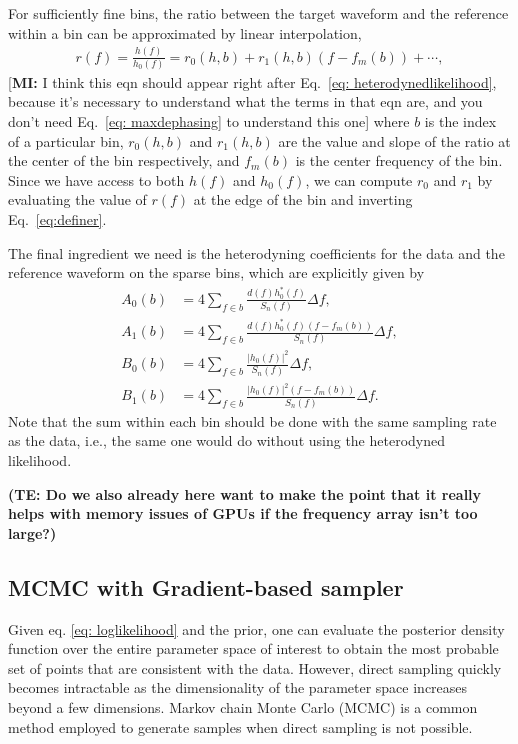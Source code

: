 \documentclass[twocolumn]{aastex631}
\newcommand{\te}[1]{\textbf{\color{pyRed}(TE: #1)}}
\newcommand{\mi}[1]{\textsf{\color{teal}[\textbf{MI:} #1]}}
\begin{document}
For sufficiently fine bins, the ratio between the target waveform
and the reference within a bin can be approximated by linear interpolation,
\begin{align}
r(f) = \frac{h(f)}{h_0(f)} = r_0(h,b) + r_1(h,b)(f- f_m(b)) + \cdots,
\label{eq:definer}
\end{align}
\mi{I think this eqn should appear right after Eq.~\eqref{eq:
heterodynedlikelihood}, because it's necessary to understand what the terms in
that eqn are, and you don't need Eq.~\eqref{eq: maxdephasing} to understand this one}
where $b$ is the index of a particular bin, $r_0(h,b)$ and $r_1(h,b)$ are the
value and slope of the ratio at the center of the bin respectively, and
$f_m(b)$ is the center frequency of the bin. Since we have access to both $h(f)$
and $h_0(f)$, we can compute $r_0$ and $r_1$ by evaluating the value of $r(f)$
at the edge of the bin and inverting Eq.~\eqref{eq:definer}.

The final ingredient we need is the heterodyning coefficients for the data and
the reference waveform on the sparse bins, which are explicitly given by
\begin{align}
    A_0(b) &= 4 \sum_{f \in b} \frac{d(f)h^*_0(f)}{S_n(f)} \Delta f, \\
    A_1(b) &= 4 \sum_{f \in b} \frac{d(f)h^*_0(f)(f-f_m(b))}{S_n(f)} \Delta f, \\
    B_0(b) &= 4 \sum_{f \in b} \frac{|h_0(f)|^2}{S_n(f)} \Delta f, \\
    B_1(b) &= 4 \sum_{f \in b} \frac{|h_0(f)|^2(f-f_m(b))}{S_n(f)} \Delta f.
\end{align}
Note that the sum within each bin should be done with the same sampling rate as
the data, i.e., the same one would do without using the heterodyned likelihood.

\te{Do we also already here want to make the point that it really helps with memory issues of GPUs if the frequency array isn't too large?}

\subsection{MCMC with Gradient-based sampler}
\label{sec:gradient}

Given eq. \ref{eq: loglikelihood} and the prior, one can evaluate the posterior
density function over the entire parameter space of interest to obtain the most
probable set of points that are consistent with the data. However, direct
sampling quickly becomes intractable as the dimensionality of the parameter
space increases beyond a few dimensions. Markov chain Monte Carlo (MCMC)
\cite{gelmanbda04} is a common method employed to generate samples when direct
sampling is not possible.
\end{document}
